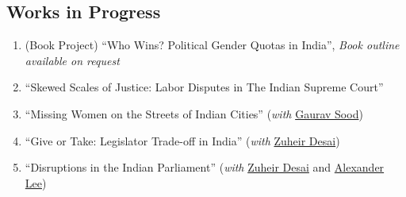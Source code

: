 \subsection*{Works in Progress} %
\label{sub:work_in_progress}
\begin{enumerate}

	\item (Book Project) ``Who Wins? Political Gender Quotas in India'', \textit{Book outline available on request}
	 \item ``Skewed Scales of Justice: Labor Disputes in The Indian Supreme Court'' 
	 \item ``Missing Women on the Streets of Indian Cities'' (\textit{with} \href{https://www.gsood.com/}{Gaurav Sood})
	\item ``Give or Take: Legislator Trade-off in India'' (\textit{with} \href{https://zuheirdesai.com/}{Zuheir Desai})
	\item ``Disruptions in the Indian Parliament''  (\textit{with} \href{https://zuheirdesai.com/}{Zuheir Desai} and \href{https://www.rochester.edu/college/faculty/alexander_lee/}{Alexander Lee})
	
	


\end{enumerate}







